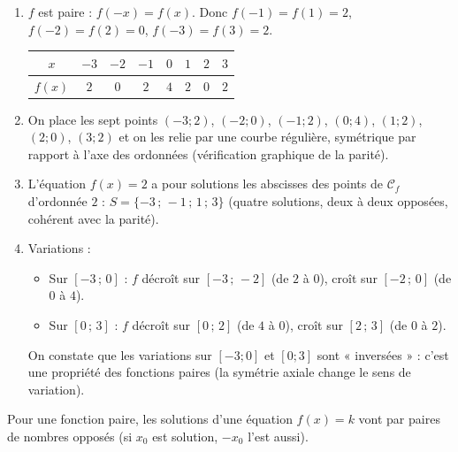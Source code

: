 \documentclass[11pt]{article}
\begin{document}
\begin{corrige}
\begin{enumerate}
    \item $f$ est paire : $f(-x)=f(x)$. Donc $f(-1)=f(1)=2$, $f(-2)=f(2)=0$, $f(-3)=f(3)=2$.
    \begin{center}
    \begin{tabular}{|c|c|c|c|c|c|c|c|}\hline
    $x$ & $-3$ & $-2$ & $-1$ & $0$ & $1$ & $2$ & $3$ \\ \hline
    $f(x)$ & $2$ & $0$ & $2$ & $4$ & $2$ & $0$ & $2$ \\ \hline
    \end{tabular}
    \end{center}
    \item On place les sept points $(-3;2)$, $(-2;0)$, $(-1;2)$, $(0;4)$, $(1;2)$, $(2;0)$, $(3;2)$ et on les relie par une courbe régulière, symétrique par rapport à l'axe des ordonnées (vérification graphique de la parité).
    \item L'équation $f(x)=2$ a pour solutions les abscisses des points de $\mathcal{C}_f$ d'ordonnée $2$ : $S=\{-3\,;\,-1\,;\,1\,;\,3\}$ (quatre solutions, deux à deux opposées, cohérent avec la parité).
    \item Variations :
    \begin{itemize}
        \item Sur $[-3\,;\,0]$ : $f$ décroît sur $[-3\,;\,-2]$ (de $2$ à $0$), croît sur $[-2\,;\,0]$ (de $0$ à $4$).
        \item Sur $[0\,;\,3]$ : $f$ décroît sur $[0\,;\,2]$ (de $4$ à $0$), croît sur $[2\,;\,3]$ (de $0$ à $2$).
    \end{itemize}
    On constate que les variations sur $[-3;0]$ et $[0;3]$ sont « inversées » : c'est une propriété des fonctions paires (la symétrie axiale change le sens de variation).
\end{enumerate}
\begin{attention}
Pour une fonction paire, les solutions d'une équation $f(x)=k$ vont par paires de nombres opposés (si $x_0$ est solution, $-x_0$ l'est aussi).
\end{attention}
\end{corrige}
\end{document}
